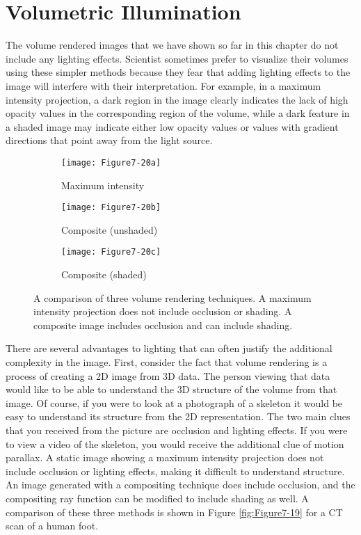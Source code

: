 \section{Volumetric Illumination}

The volume rendered images that we have shown so far in this chapter do not include any lighting effects. Scientist sometimes prefer to visualize their volumes using these simpler methods because they fear that adding lighting effects to the image will interfere with their interpretation. For example, in a maximum intensity projection, a dark region in the image clearly indicates the lack of high opacity values in the corresponding region of the volume, while a dark feature in a shaded image may indicate either low opacity values or values with gradient directions that point away from the light source.

\begin{figure}[!htb]
	\begin{subfigure}[h]{0.32\linewidth}
		\texttt{[image: Figure7-20a]}
		\caption*{Maximum intensity}\label{fig:Figure7-20a}
	\end{subfigure}
	\hfill
	\begin{subfigure}[h]{0.32\linewidth}
		\texttt{[image: Figure7-20b]}
		\caption*{Composite (unshaded)}\label{fig:Figure7-20b}
	\end{subfigure}%
	\hfill
	\begin{subfigure}[h]{0.32\linewidth}
		\texttt{[image: Figure7-20c]}
		\caption*{Composite (shaded)}\label{fig:Figure7-20c}
	\end{subfigure}%
	\caption{A comparison of three volume rendering techniques. A maximum intensity projection does not include occlusion or shading. A composite image includes occlusion and can include shading.}\label{fig:Figure7-20}
\end{figure}

There are several advantages to lighting that can often justify the additional complexity in the image. First, consider the fact that volume rendering is a process of creating a 2D image from 3D data. The person viewing that data would like to be able to understand the 3D structure of the volume from that image. Of course, if you were to look at a photograph of a skeleton it would be easy to understand its structure from the 2D representation. The two main clues that you received from the picture are occlusion and lighting effects. If you were to view a video of the skeleton, you would receive the additional clue of motion parallax. A static image showing a maximum intensity projection does not include occlusion or lighting effects, making it difficult to understand structure. An image generated with a compositing technique does include occlusion, and the compositing ray function can be modified to include shading as well. A comparison of these three methods is shown in Figure \ref{fig:Figure7-19} for a CT scan of a human foot.

